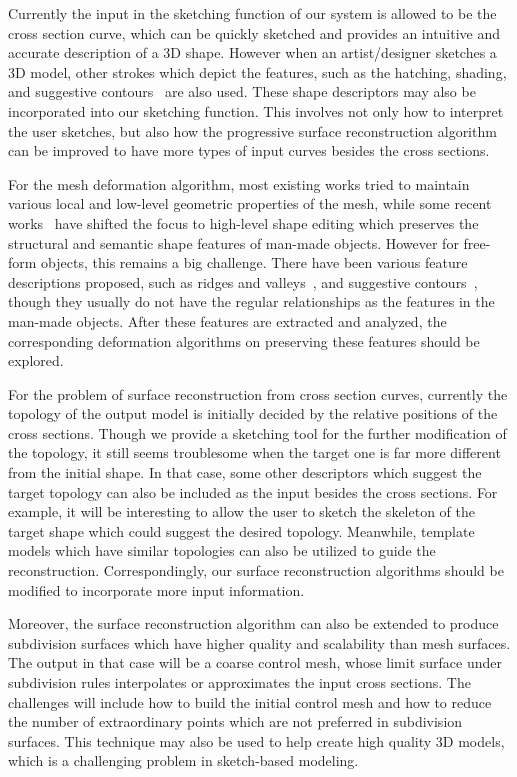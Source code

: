 Currently the input in the sketching function of our system  is
allowed to be the cross section curve, which can be quickly sketched
and provides an intuitive and accurate description of a 3D shape.
However when an artist/designer sketches a 3D model, other strokes
which depict the features, such as the hatching, shading, and
suggestive contours~\cite{DFRS03} are also used. These shape
descriptors may also be incorporated into our sketching function.
This involves not only how to interpret the user sketches, but also
how the progressive surface reconstruction algorithm can be improved
to have more types of input curves besides the cross sections.

For the mesh deformation algorithm, most existing works  tried to
maintain various local and low-level geometric properties of the
mesh, while some recent works~\cite{GSMC09,ZFCAT11} have shifted the
focus to high-level shape editing which preserves the structural and
semantic shape features of man-made objects. However for free-form
objects, this remains a big challenge. There have been various
feature descriptions proposed, such as ridges and
valleys~\cite{OBS04}, and suggestive contours~\cite{DFRS03}, though
they usually do not have the regular relationships as the features
in the man-made objects. After these features are extracted and
analyzed, the corresponding deformation algorithms on preserving
these features should be explored.

For the problem of surface reconstruction from cross  section
curves, currently the topology of the output model is initially
decided by the relative positions of the cross sections. Though we
provide a sketching tool for the further modification of the
topology, it still seems troublesome when the target one is far more
different from the initial shape. In that case, some other
descriptors which suggest the target topology can also be included
as the input besides the cross sections. For example, it will be
interesting to allow the user to sketch the skeleton of the target
shape which could suggest the desired topology. Meanwhile, template
models which have similar topologies can also be utilized to guide
the reconstruction. Correspondingly, our surface reconstruction
algorithms should be modified to incorporate more input information.

Moreover, the surface reconstruction algorithm can also  be extended
to produce subdivision surfaces which have higher quality and
scalability than mesh surfaces. The output in that case will be a
coarse control mesh, whose limit surface under subdivision rules
interpolates or approximates the input cross sections. The
challenges will include how to build the initial control mesh and
how to reduce the number of extraordinary points which are not
preferred in subdivision surfaces. This technique may also be used
to help create high quality 3D models, which is a challenging
problem in sketch-based modeling.



